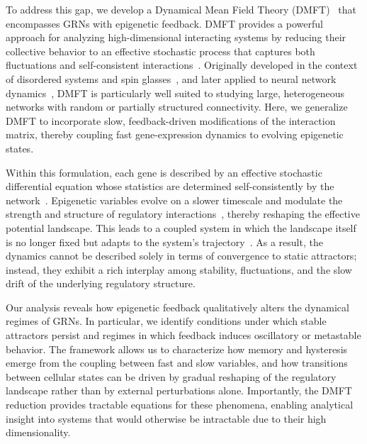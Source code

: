 \documentclass[reprint,amsmath,amssymb,aps]{revtex4-2}
\begin{document}
To address this gap, we develop a Dynamical Mean Field Theory (DMFT)~\cite{Sompolinsky1988,sompolinsky1982relaxational,crisanti1987dynamics} that encompasses GRNs with epigenetic feedback. DMFT provides a powerful approach for analyzing high-dimensional interacting systems by reducing their collective behavior to an effective stochastic process that captures both fluctuations and self-consistent interactions~\cite{Sompolinsky1988,sompolinsky1982relaxational,rajan2010stimulus,crisanti1987dynamics,van1992stochastic}. Originally developed in the context of disordered systems and spin glasses~\cite{Sompolinsky1988,sompolinsky1982relaxational}, and later applied to neural network dynamics~\cite{panda2017chaos,rajan2010stimulus}, DMFT is particularly well suited to studying large, heterogeneous networks with random or partially structured connectivity. Here, we generalize DMFT to incorporate slow, feedback-driven modifications of the interaction matrix, thereby coupling fast gene-expression dynamics to evolving epigenetic states.

Within this formulation, each gene is described by an effective stochastic differential equation whose statistics are determined self-consistently by the network~\cite{Sompolinsky1988,sompolinsky1982relaxational,rajan2010stimulus,panda2017chaos}. Epigenetic variables evolve on a slower timescale and modulate the strength and structure of regulatory interactions~\cite{KanekoPRR2020,matsushita2022dynamical}, thereby reshaping the effective potential landscape. This leads to a coupled system in which the landscape itself is no longer fixed but adapts to the system’s trajectory~\cite{KanekoPRR2020,matsushita2022dynamical}. As a result, the dynamics cannot be described solely in terms of convergence to static attractors; instead, they exhibit a rich interplay among stability, fluctuations, and the slow drift of the underlying regulatory structure.

Our analysis reveals how epigenetic feedback qualitatively alters the dynamical regimes of GRNs. In particular, we identify conditions under which stable attractors persist and regimes in which feedback induces oscillatory or metastable behavior. The framework allows us to characterize how memory and hysteresis emerge from the coupling between fast and slow variables, and how transitions between cellular states can be driven by gradual reshaping of the regulatory landscape rather than by external perturbations alone. Importantly, the DMFT reduction provides tractable equations for these phenomena, enabling analytical insight into systems that would otherwise be intractable due to their high dimensionality.
\end{document}
